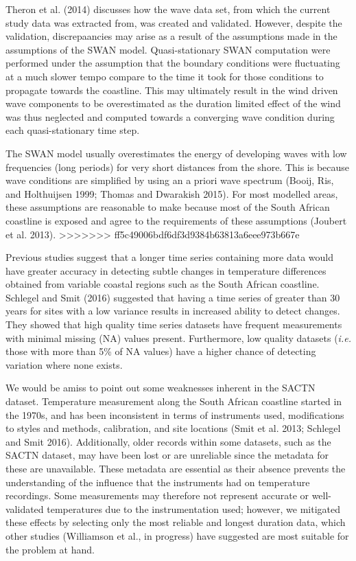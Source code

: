 \documentclass[12pt,A4paper,]{article}
\begin{document}
Theron et al. (2014) discusses how the wave data set, from which the
current study data was extracted from, was created and validated.
However, despite the validation, discrepaancies may arise as a result of
the assumptions made in the assumptions of the SWAN model.
Quasi-stationary SWAN computation were performed under the assumption
that the boundary conditions were fluctuating at a much slower tempo
compare to the time it took for those conditions to propagate towards
the coastline. This may ultimately result in the wind driven wave
components to be overestimated as the duration limited effect of the
wind was thus neglected and computed towards a converging wave condition
during each quasi-stationary time step.

The SWAN model usually overestimates the energy of developing waves with
low frequencies (long periods) for very short distances from the shore.
This is because wave conditions are simplified by using an a priori wave
spectrum (Booij, Ris, and Holthuijsen 1999; Thomas and Dwarakish 2015).
For most modelled areas, these assumptions are reasonable to make
because most of the South African coastline is exposed and agree to the
requirements of these assumptions (Joubert et al. 2013).
>>>>>>> ff5c49006bdf6df3d9384b63813a6eee973b667e

Previous studies suggest that a longer time series containing more data
would have greater accuracy in detecting subtle changes in temperature
differences obtained from variable coastal regions such as the South
African coastline. Schlegel and Smit (2016) suggested that having a time
series of greater than 30 years for sites with a low variance results in
increased ability to detect changes. They showed that high quality time
series datasets have frequent measurements with minimal missing (NA)
values present. Furthermore, low quality datasets (\emph{i.e.} those
with more than 5\% of NA values) have a higher chance of detecting
variation where none exists.

We would be amiss to point out some weaknesses inherent in the SACTN
dataset. Temperature measurement along the South African coastline
started in the 1970s, and has been inconsistent in terms of instruments
used, modifications to styles and methods, calibration, and site
locations (Smit et al. 2013; Schlegel and Smit 2016). Additionally,
older records within some datasets, such as the SACTN dataset, may have
been lost or are unreliable since the metadata for these are
unavailable. These metadata are essential as their absence prevents the
understanding of the influence that the instruments had on temperature
recordings. Some measurements may therefore not represent accurate or
well-validated temperatures due to the instrumentation used; however, we
mitigated these effects by selecting only the most reliable and longest
duration data, which other studies (Williamson et al., in progress) have
suggested are most suitable for the problem at hand.
\end{document}
